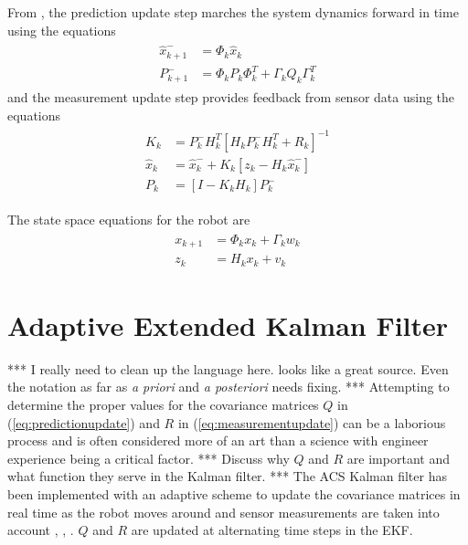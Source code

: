 \documentclass[12pt]{report}
\begin{document}
\begin{spacing}{1.1}
From \cite{Kelly_1994_338}, \cite{Simon06OptimalEstimation} the prediction update step marches the system dynamics forward in time using the equations
\begin{align}
\label{eq:predictionupdate}
\begin{split}
\hat{x}_{k+1}^- &= \Phi_k\hat{x}_k \\
P_{k+1}^- &= \Phi_kP_k\Phi_k^T + \Gamma_kQ_k\Gamma_k^T
\end{split}
\end{align}
and the measurement update step provides feedback from sensor data using the equations
\begin{align}
\label{eq:measurementupdate}
\begin{split}
K_k &= P_k^-H_k^T\left[H_kP_k^-H_k^T + R_k\right]^{-1} \\
\hat{x}_k &= \hat{x}_k^- + K_k\left[z_k - H_k\hat{x}_k^-\right] \\
P_k &= \left[I - K_kH_k\right]P_k^-
\end{split}
\end{align}

The state space equations for the robot are
\begin{align}
\label{eq:discretess}
\begin{split}
x_{k+1} &= \Phi_kx_k + \Gamma_kw_k \\
z_k &= H_kx_k + v_k
\end{split}
\end{align}

\section{Adaptive Extended Kalman Filter}
*** I really need to clean up the language here. \cite{Busse03adaptiveEKF} looks like a great source. Even the notation as far as \textit{a priori} and \textit{a posteriori} needs fixing. *** Attempting to determine the proper values for the covariance matrices $Q$ in (\ref{eq:predictionupdate}) and $R$ in (\ref{eq:measurementupdate}) can be a laborious process and is often considered more of an art than a science with engineer experience being a critical factor. *** Discuss why $Q$ and $R$ are important and what function they serve in the Kalman filter. *** The ACS Kalman filter has been implemented with an adaptive scheme to update the covariance matrices in real time as the robot moves around and sensor measurements are taken into account \cite{Sights06}, \cite{Mehra72}, \cite{Busse03adaptiveEKF}. $Q$ and $R$ are updated at alternating time steps in the EKF.


\end{spacing}
\end{document}
